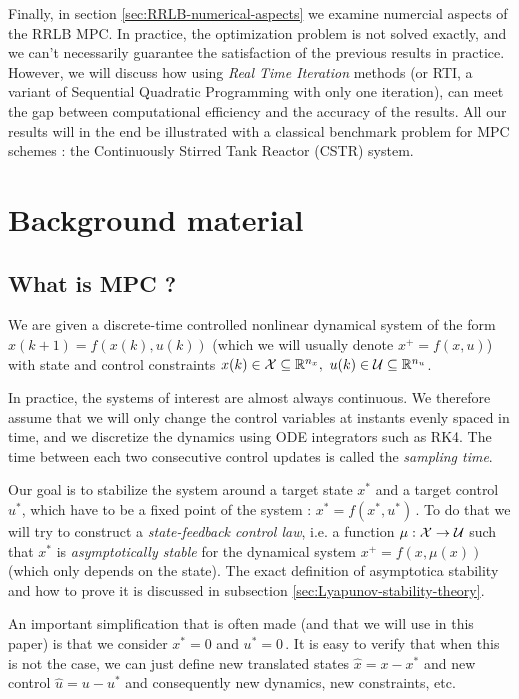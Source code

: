 \documentclass[12pt]{article}
\begin{document}
Finally, in section \ref{sec:RRLB-numerical-aspects} we examine numercial aspects of the RRLB MPC.
In practice, the optimization problem is not solved exactly, and we can't necessarily guarantee the satisfaction of the previous results in practice.
However, we will discuss how using \textit{Real Time Iteration} methods (or RTI, a variant of Sequential Quadratic Programming with only one iteration), can meet the gap between computational efficiency and the accuracy of the results.
All our results will in the end be illustrated with a classical benchmark problem for MPC schemes : the Continuously Stirred Tank Reactor (CSTR) system.

\section{Background material}\label{sec:background-material}

\subsection{What is MPC ?}\label{sec:what-is-MPC}

We are given a discrete-time controlled nonlinear dynamical system of the form $x(k+1)=f(x(k), u(k))$ (which we will usually denote $x^+=f(x,u)$) with state and control constraints $x(k)\in\cal{X}\subseteq\R^{n_x},~u(k)\in\cal{U}\subseteq\R^{n_u}$.

In practice, the systems of interest are almost always continuous. We therefore assume that we will only change the control variables at instants evenly spaced in time, and we discretize the dynamics using ODE integrators such as RK4. The time between each two consecutive control updates is called the \textit{sampling time}.

Our goal is to stabilize the system around a target state $x^*$ and a target control $u^*$, which have to be a fixed point of the system : $x^*=f(x^*, u^*)$\,.
To do that we will try to construct a \textit{state-feedback control law}, i.e. a function $\mu:\cal{X}\to\cal{U}$ such that $x^*$ is \textit{asymptotically stable} for the dynamical system $x^+=f(x,\mu(x))$ (which only depends on the state).
The exact definition of asymptotica stability and how to prove it is discussed in subsection \ref{sec:Lyapunov-stability-theory}.

An important simplification that is often made (and that we will use in this paper) is that we consider $x^*=0$ and $u^*=0$\,.
It is easy to verify that when this is not the case, we can just define new translated states $\hat{x}=x-x^*$ and new control $\hat{u}=u-u^*$ and consequently new dynamics, new constraints, etc.
\end{document}
